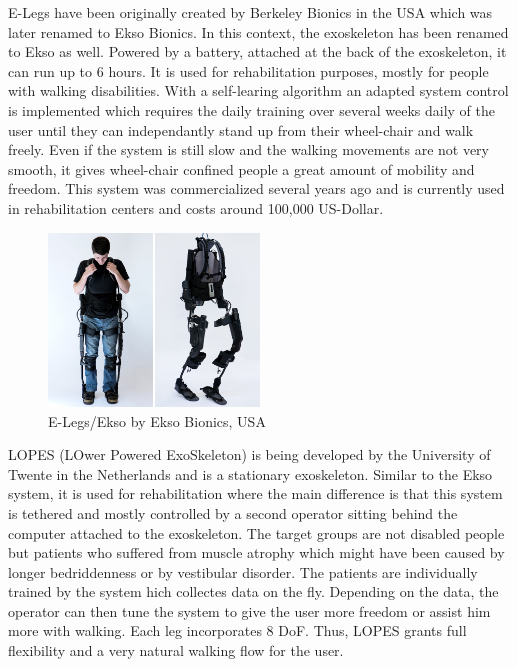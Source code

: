 \documentclass[letterpaper, 10 pt, conference]{ieeeconf}  %
\begin{document}
E-Legs have been originally created by Berkeley Bionics in the USA which was later renamed to Ekso Bionics. In this context,
the exoskeleton has been renamed to Ekso as well. Powered by a battery, attached at the back of the exoskeleton, it can run
up to 6 hours. It is used for rehabilitation purposes, mostly for people with walking disabilities. With a self-learing
algorithm an adapted system control is implemented which requires the daily training over several weeks daily of the user
until they can independantly stand up from their wheel-chair and walk freely. Even if the system is still slow and the
walking movements are not very smooth, it gives wheel-chair confined people a great amount of mobility and freedom.
This system was commercialized several years ago and is currently used in rehabilitation centers and costs around 100,000 US-Dollar. \newline


\begin{figure}[H]
  \centering
    \includegraphics[width=0.5\textwidth]{img/elegs}
  \caption{E-Legs/Ekso by Ekso Bionics, USA}
\end{figure}


LOPES (LOwer Powered ExoSkeleton) is being developed by the University of Twente in the Netherlands and is a stationary
exoskeleton. Similar to the Ekso system, it is used for rehabilitation where the main difference is that this system
is tethered and mostly controlled by a second operator sitting behind the computer attached to the exoskeleton.
The target groups are not disabled people but patients who suffered from muscle atrophy which might have been caused
by longer bedriddenness or by vestibular disorder. The patients are individually trained by the system
hich collectes data on the fly. Depending on the data, the operator can then tune the system to give the user
more freedom or assist him more with walking. Each leg incorporates 8 DoF. Thus, LOPES grants full flexibility and
a very natural walking flow for the user.\newpage
\end{document}
